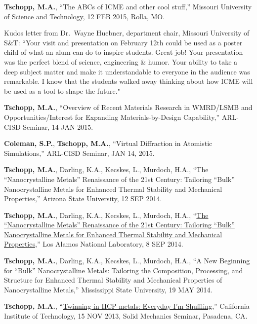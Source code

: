 \begin{cvlist}
\item
\textbf{Tschopp, M.A.}, ``The ABCs of ICME and other cool stuff,'' Missouri University of Science and Technology, 12 FEB 2015, Rolla, MO.
\begin{list2}
\item[$\star$] Kudos letter from Dr.~Wayne Huebner, department chair, Missouri University of S\&T: ``Your visit and presentation on February 12th could be used as a poster child of what an alum can do to inspire students. Great job! Your presentation was the perfect blend of science, engineering \& humor. Your ability to take a deep subject matter and make it understandable to everyone in the audience was remarkable. I know that the students walked away thinking about how ICME will be used as a tool to shape the future."
\end{list2}

\item
\textbf{Tschopp, M.A.}, ``Overview of Recent Materials Research in WMRD/LSMB and Opportunities/Interest for Expanding Materials-by-Design Capability,'' ARL-CISD Seminar, 14 JAN 2015.

\item
{\textbf{Coleman, S.P.}}, \textbf{Tschopp, M.A.}, ``Virtual Diffraction in Atomistic Simulations,'' ARL-CISD Seminar, JAN 14, 2015.

\item
\textbf{Tschopp, M.A.}, Darling, K.A., Kecskes, L., Murdoch, H.A., ``The ``Nanocrystalline Metals'' Renaissance of the 21st Century: Tailoring ``Bulk'' Nanocrystalline Metals for Enhanced Thermal Stability and Mechanical Properties,'' Arizona State University, 12 SEP 2014.

\item
\textbf{Tschopp, M.A.}, Darling, K.A., Kecskes, L., Murdoch, H.A., ``\href{http://dx.doi.org/10.13140/2.1.1582.6726}{The ``Nanocrystalline Metals'' Renaissance of the 21st Century: Tailoring ``Bulk'' Nanocrystalline Metals for Enhanced Thermal Stability and Mechanical Properties},'' Los Alamos National Laboratory, 8 SEP 2014.

\item
\textbf{Tschopp, M.A.}, Darling, K.A., Kecskes, L., Murdoch, H.A.,  ``A New Beginning for ``Bulk'' Nanocrystalline Metals: Tailoring the Composition, Processing, and Structure for Enhanced Thermal Stability and Mechanical Properties of Nanocrystalline Metals,'' Mississippi State University, 19 MAY 2014.

\item
\textbf{Tschopp, M.A.}, ``\href{http://dx.doi.org/10.13140/2.1.5154.3847}{Twinning in HCP metals: Everyday I'm Shuffling},'' California Institute of Technology, 15 NOV 2013, Solid Mechanics Seminar, Pasadena, CA.


\end{cvlist}
